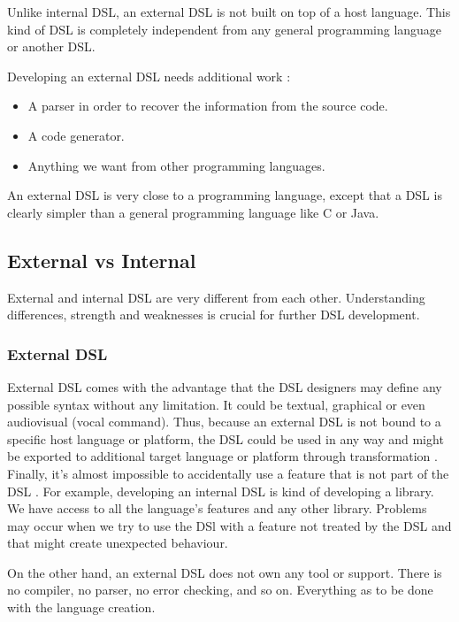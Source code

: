 Unlike internal \gls{DSL}, an external \gls{DSL} is not built on
top of a host language. This kind of \gls{DSL} is completely independent from
any general programming language or another \gls{DSL}.

Developing an external \gls{DSL} needs additional work :
\begin{itemize}
\item A parser in order to recover the information from the source code.
\item A code generator.
\item Anything we want from other programming languages.
\end{itemize}

An external \gls{DSL} is very close to a programming language, except that a
\gls{DSL} is clearly simpler than a general programming language like C or Java.

\subsection{External vs Internal}
\label{sec:external_vs_internal}

External and internal \gls{DSL} are very different from each other. 
Understanding differences, strength and weaknesses is crucial for
further \gls{DSL} development.

\subsubsection{External \gls{DSL}}
\label{subsubsec:external_dsl}

External \gls{DSL} comes with the advantage that the \gls{DSL} designers may
define any possible syntax without any limitation\cite{strembeckmarkzdunuwe2009}. It could be textual,
graphical or even audiovisual (vocal command). Thus, because an external
\gls{DSL} is not bound to a specific host language or platform, the \gls{DSL}
could be used in any way and might be exported to additional target language or
platform through transformation \cite{strembeckmarkzdunuwe2009}. Finally, it's
almost impossible to accidentally use a feature that is not part of the \gls{DSL}
\cite{strembeckmarkzdunuwe2009}. For example, developing an internal DSL is kind
of developing a library. We have access to all the language's features and any
other library. Problems may occur when we try to use the DSl with a feature
not treated by the DSL and that might create unexpected behaviour.

On the other hand, an external \gls{DSL} does not own any tool or support. There
is no compiler, no parser, no error checking, and so on. Everything as to be done
with the language creation.

